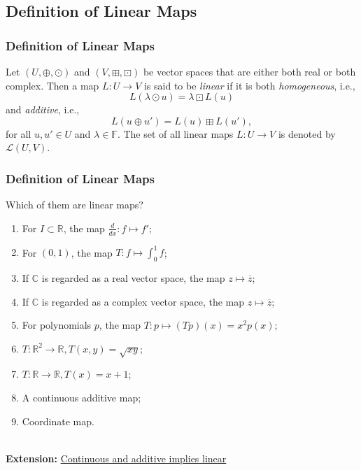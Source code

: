 \documentclass[12pt, t]{beamer}
\renewcommand{\emph}[1]{{\color{Turquoise3}\textsl{#1}}}
\newcommand{\C}{\mathbb{C}} \newcommand{\F}{\mathbb{F}} \newcommand{\R}{\mathbb{R}} \newcommand{\Q}{\mathbb{Q}}
\newcommand{\nullspace}{~\\[15pt]}
\begin{document}
\subsection{Definition of Linear Maps}
\begin{frame}
    \frametitle{Definition of Linear Maps}
    Let $(U,\oplus,\odot)$ and $(V,\boxplus,\boxdot)$ be vector spaces that are either both real or both complex. Then a map $L:U\rightarrow V$ is said to be \emph{linear} if it is both \emph{homogeneous}, i.e.,
    \[L(\lambda\odot u)=\lambda\boxdot L(u)\]
    and \emph{additive}, i.e.,
    \[L(u\oplus u')=L(u)\boxplus L(u'),\]
    for all $u,u'\in U$ and $\lambda\in\F$. The set of all linear maps $L:U\rightarrow V$ is denoted by $\mathcal{L}(U,V).$
\end{frame}

\begin{frame}
    \frametitle{Definition of Linear Maps}

    Which of them are linear maps?
    \begin{enumerate}
        \item For $I\subset\R$, the map $\frac{d}{dx}:f\mapsto f'$;
        \item For $(0,1)$, the map $T:f\mapsto \int^{1}_0f$;
        \item If $\C$ is regarded as a real vector space, the map $z\mapsto\overline{z}$;
        \item If $\C$ is regarded as a complex vector space, the map $z\mapsto\overline{z}$;
        \item For polynomials $p$, the map $T:p\mapsto (Tp)(x)=x^2p(x)$;
        \item $T:\R^2\rightarrow\R, T(x,y)=\sqrt{xy}$;
        \item $T:\R\rightarrow\R, T(x)=x+1$;
        \item A continuous additive map;
        \item Coordinate map.
    \end{enumerate}

    \pause

    \nullspace
    \textbf{Extension:}
    \href{https://math.stackexchange.com/questions/152632/continuous-and-additive-implies-linear}{Continuous and additive implies linear}
\end{frame}
\end{document}
